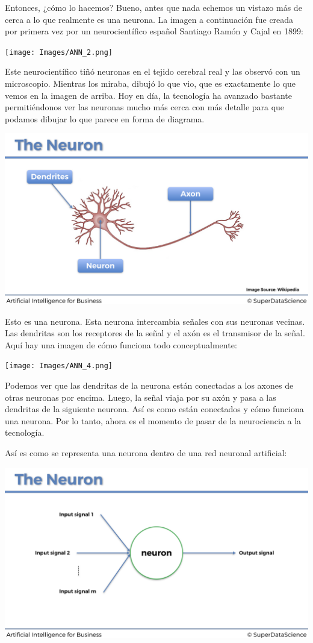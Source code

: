 \documentclass[]{book}
\begin{document}
Entonces, ¿cómo lo hacemos? Bueno, antes que nada echemos un vistazo más de cerca a lo que realmente es una neurona. La imagen a continuación fue creada por primera vez por un neurocientífico español Santiago Ramón y Cajal en 1899:

\texttt{[image: Images/ANN\_2.png]}

Este neurocientífico tiñó neuronas en el tejido cerebral real y las observó con un microscopio. Mientras los miraba, dibujó lo que vio, que es exactamente lo que vemos en la imagen de arriba. Hoy en día, la tecnología ha avanzado bastante permitiéndonos ver las neuronas mucho más cerca con más detalle para que podamos dibujar lo que parece en forma de diagrama.

\includegraphics{Images/ANN_3.png}

Esto es una neurona. Esta neurona intercambia señales con sus neuronas vecinas. Las dendritas son los receptores de la señal y el axón es el transmisor de la señal. Aquí hay una imagen de cómo funciona todo conceptualmente:

\texttt{[image: Images/ANN\_4.png]}

Podemos ver que las dendritas de la neurona están conectadas a los axones de otras neuronas por encima. Luego, la señal viaja por su axón y pasa a las dendritas de la siguiente neurona. Así es como están conectados y cómo funciona una neurona. Por lo tanto, ahora es el momento de pasar de la neurociencia a la tecnología.

Así es como se representa una neurona dentro de una red neuronal artificial:

\includegraphics{Images/ANN_5.png}
\end{document}
